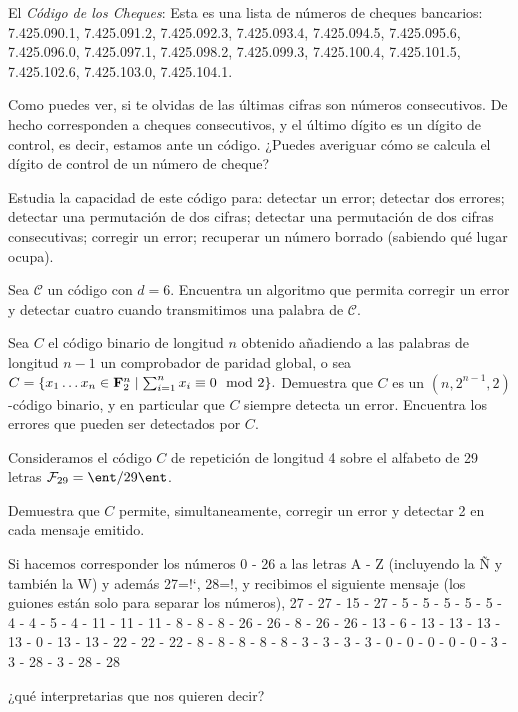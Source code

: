 \begin{problem}[6]  El {\it Código de los Cheques}: Esta es una lista de
números de cheques bancarios: 7.425.090.1, 7.425.091.2,
7.425.092.3, 7.425.093.4, 7.425.094.5, 7.425.095.6, 7.425.096.0,
7.425.097.1, 7.425.098.2, 7.425.099.3, 7.425.100.4, 7.425.101.5,
7.425.102.6,   7.425.103.0,    7.425.104.1.

\ppart Como puedes ver, si te olvidas de las últimas cifras son
números consecutivos. De hecho corresponden a cheques
consecutivos, y el último dígito es un dígito de control, es
decir, estamos ante un código. ¿Puedes averiguar cómo se calcula
el dígito de control de un número de cheque?

\ppart Estudia la capacidad de este código para: detectar un error;
detectar dos errores; detectar una permutación de dos cifras;
detectar una permutación de dos cifras consecutivas; corregir un
error; recuperar un número borrado (sabiendo qué lugar ocupa).
\solution
\end{problem}


\begin{problem}[7] Sea $\mathcal C$ un código con $d=6$. Encuentra un algoritmo que permita   corregir un error y detectar cuatro cuando transmitimos una palabra de $\mathcal C$.
\solution
\end{problem}


\begin{problem}[8]  Sea $C$ el código binario de longitud $n$ obtenido
añadiendo a las palabras de longitud $n-1$ un comprobador de
paridad global, o sea $ C=\{x_1\dots x_n\in\bold F_2^n \mid
\sum_{i=1}^n x_i\equiv 0\mod 2\}. $ Demuestra que $C$ es un
$(n,2^{n-1},2)$-código binario, y en particular que $C$ siempre
detecta un error. Encuentra  los errores que
pueden ser detectados por $C$.
\solution
\end{problem}

\begin{problem}[9] Consideramos el código $C$ de repetición de longitud 4 sobre
el alfabeto de 29 letras $\mathcal{F}_{29}=\ent/{29}\ent$.

\ppart Demuestra que $C$ permite, simultaneamente, corregir un error y
detectar 2 en cada mensaje emitido.

\ppart Si hacemos corresponder los números 0 - 26 a las letras A - Z
(incluyendo la Ñ y también la W) y además 27=!`, 28=!, y recibimos
el siguiente mensaje (los guiones están solo para separar los
números), 27 - 27 - 15 - 27 - 5 - 5 - 5 - 5 - 5 - 4 - 4 - 5 - 4 -
11 - 11 - 11 - 8 - 8 - 8 - 26 - 26 - 8 - 26 - 26 - 13 - 6 - 13 -
13 - 13 - 13 - 0 - 13 - 13 - 22 - 22 - 22 - 8 - 8 - 8 - 8 -
 8 - 3 - 3 - 3 - 3 - 0 - 0 - 0 - 0 - 0 - 3 - 3 - 28 - 3 - 28 - 28

¿qué interpretarias que nos quieren decir?
\solution
\end{problem}

